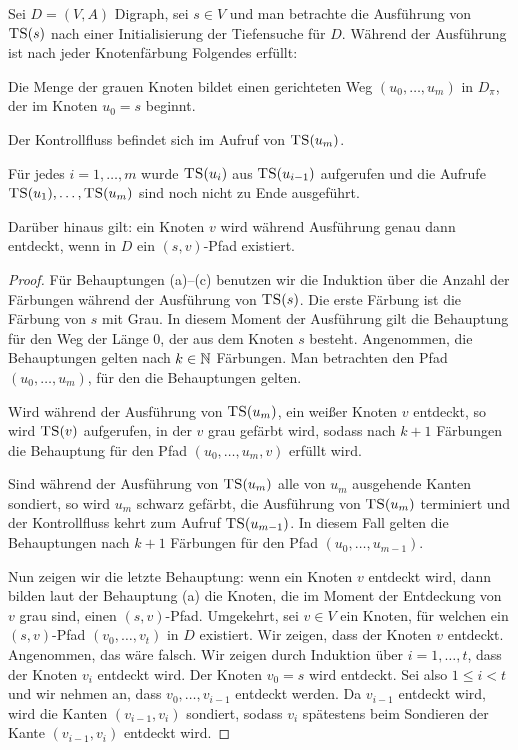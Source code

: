 \begin{lem} \label{ts:key:lemma} 
	Sei $D=(V,A)$ Digraph, sei $s \in V$ und man betrachte die Ausführung von $\mathop{\text{\textsc{TS}}}(s)$ nach einer Initialisierung der Tiefensuche für $D$. Während der Ausführung ist  nach jeder Knotenfärbung  Folgendes erfüllt:
	\begin{enuma} 
		\item Die Menge der grauen Knoten bildet einen gerichteten Weg $(u_0,\ldots,u_m)$ in $D_\pi$, der im Knoten $u_0=s$ beginnt. 
		\item Der Kontrollfluss befindet sich im Aufruf von $\mathop{\text{\textsc{TS}}}(u_m)$. 
		\item Für jedes $i=1,\ldots,m$ wurde $\mathop{\text{\textsc{TS}}}(u_i)$  aus $\mathop{\text{\textsc{TS}}}(u_{i-1})$ aufgerufen und die Aufrufe $\mathop{\text{\textsc{TS}}}(u_1),\ldots,\mathop{\text{\textsc{TS}}}(u_m)$ sind noch nicht zu Ende ausgeführt. 
	\end{enuma} 
	Darüber hinaus gilt: ein Knoten $v$ wird während Ausführung genau dann entdeckt, wenn in $D$ ein $(s,v)$-Pfad existiert. 
\end{lem} 
\begin{proof}
	Für Behauptungen (a)--(c) benutzen wir die Induktion über die Anzahl der Färbungen während der Ausführung von $\mathop{\text{\textsc{TS}}}(s)$. Die erste Färbung ist die Färbung von $s$ mit Grau. In diesem Moment der Ausführung gilt die Behauptung für  den Weg der Länge $0$, der aus dem Knoten $s$ besteht. Angenommen, die Behauptungen gelten nach $k \in\mathbb{N}$ Färbungen. Man betrachten den Pfad $(u_0,\ldots,u_m)$, für den die Behauptungen gelten. 
	
	Wird während der Ausführung von $\mathop{\text{\textsc{TS}}}(u_m)$, ein weißer Knoten $v$ entdeckt, so wird $\mathop{\text{\textsc{TS}}}(v)$ aufgerufen, in der $v$ grau gefärbt wird, sodass nach $k+1$ Färbungen die Behauptung für den Pfad $(u_0,\ldots,u_m,v)$ erfüllt wird. 
	
	Sind während der Ausführung von $\mathop{\text{\textsc{TS}}}(u_m)$ alle von $u_m$ ausgehende Kanten sondiert, so wird $u_m$ schwarz gefärbt, die Ausführung von $\mathop{\text{\textsc{TS}}}(u_m)$ terminiert und der Kontrollfluss kehrt zum Aufruf $\mathop{\text{\textsc{TS}}}(u_{m-1})$. In diesem Fall gelten die Behauptungen nach $k+1$ Färbungen für den Pfad $(u_0,\ldots,u_{m-1})$. 
	
	Nun zeigen wir die letzte Behauptung: wenn ein Knoten $v$ entdeckt wird, dann bilden laut der Behauptung (a) die Knoten, die im Moment der Entdeckung von $v$ grau sind, einen $(s,v)$-Pfad. Umgekehrt, sei $v \in V$ ein Knoten, für welchen ein $(s,v)$-Pfad $(v_0,\ldots,v_t)$ in $D$ existiert. Wir zeigen, dass der Knoten $v$ entdeckt. Angenommen, das wäre falsch. Wir zeigen durch Induktion über $i=1,\ldots,t$, dass der Knoten $v_i$ entdeckt wird. Der Knoten $v_0=s$ wird entdeckt. Sei also $1 \le i < t$ und wir nehmen an, dass $v_0,\ldots,v_{i-1}$ entdeckt werden. Da $v_{i-1}$ entdeckt wird, wird die Kanten $(v_{i-1},v_i)$ sondiert, sodass $v_i$ spätestens beim Sondieren der Kante $(v_{i-1},v_i)$ entdeckt wird. 
\end{proof} 

